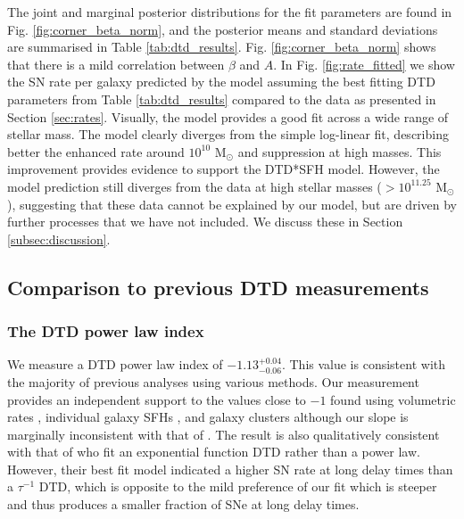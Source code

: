 \documentclass[fleqn,usenatbib]{mnras}
\begin{document}
The joint and marginal posterior distributions for the fit parameters are found in Fig. \ref{fig:corner_beta_norm}, and the posterior means and standard deviations are summarised in Table \ref{tab:dtd_results}.  Fig. \ref{fig:corner_beta_norm} shows that there is a mild correlation between $\beta$ and $A$. In Fig. \ref{fig:rate_fitted} we show the SN rate per galaxy predicted by the model assuming the best fitting DTD parameters from Table \ref{tab:dtd_results} compared to the data as presented in Section \ref{sec:rates}. Visually, the model provides a good fit across a wide range of stellar mass. The model clearly diverges from the simple log-linear fit, describing better the enhanced rate around $10^{10}$ M$_{\odot}$ and suppression at high masses. This improvement provides evidence to support the DTD*SFH model. However, the model prediction still diverges from the data at high stellar masses ($>10^{11.25}$ M$_{\odot}$), suggesting that these data cannot be explained by our model, but are driven by further processes that we have not included. We discuss these in Section \ref{subsec:discussion}. 

\subsection{Comparison to previous DTD measurements \label{subsec:compare_dtd}}

\subsubsection{The DTD power law index \label{subsubsec:compare_beta}}
We measure a DTD power law index of $-1.13^{+0.04}_{-0.06}$. This value is consistent with the majority of previous analyses using various methods. Our measurement provides an independent support to the values close to $-1$ found using volumetric rates \citep[e.g.][]{Graur2011,Graur2014,Frohmaier2019}, individual galaxy SFHs \citep[e.g.][]{Maoz2012,Graur2013}, and galaxy clusters \citep[e.g.][]{Maoz2010} although our slope is marginally inconsistent with that of \citet{Heringer2019}. The result is also qualitatively consistent with that of \citet{Strolger2020a} who fit an exponential function DTD rather than a power law. However, their best fit model indicated a higher SN rate at long delay times than a $\tau^{-1}$ DTD, which is opposite to the mild preference of our fit which is steeper and thus produces a smaller fraction of SNe at long delay times.
\end{document}
